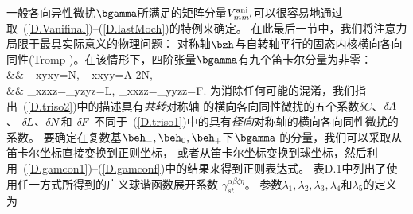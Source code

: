 一般各向异性微扰$\bgamma$所满足的矩阵分量$V_{mm'}^{\rm ani}$可以很容易地通过
取~(\ref{D.Vanifinal})--(\ref{D.lastMoch})的特例来确定。
在此最后一节中，我们将注意力局限于最具实际意义的物理问题：
对称轴$\bzh$与自转轴平行的固态内核横向各向同性(Tromp \citeyear{tromp95})。在该情形下，四阶张量$\bgamma$有九个笛卡尔分量为非零：
\eqa \label{D.triso2} 
\nonumber \\
&&\mbox{}\hspace{-7.0 mm}
\gamma_{xyxy}=\delta\hspace{-0.3 mm}N,\qquad
\gamma_{xxyy}=\delta\hspace{-0.3 mm}A-2\hspace{0.4 mm}\delta\hspace{-0.3 mm}N,
\\
&&\mbox{}\hspace{-7.0 mm}
\gamma_{xzxz}=\gamma_{yzyz}=\delta\hspace{-0.3 mm}L,\qquad
\gamma_{xxzz}=\gamma_{yyzz}=\delta\hspace{-0.3 mm}F. \nonumber
\ena
为消除任何可能的混淆，我们指出~(\ref{D.triso2})中的描述具有{\em 共转\/}对称轴
的横向各向同性微扰的五个系数$\delta C$、$\delta\hspace{-0.3 mm}A$、
$\delta\hspace{-0.3 mm}L$、$\delta\hspace{-0.3 mm}N$和
$\delta\hspace{-0.3 mm}F$ 
不同于~(\ref{D.triso1})中的具有{\em 径向\/}对称轴的横向各向同性微扰的系数。
要确定在复数基$\beh_-,\beh_0,\beh_+$下$\bgamma$ 的分量，我们可以采取从笛卡尔坐标直接变换到正则坐标，
或者从笛卡尔坐标变换到球坐标，然后利用~(\ref{D.gamcon1})--(\ref{D.gamconf})中的结果来得到正则表达式。
表D.1中列出了使用任一方式所得到的广义球谐函数展开系数 $\gamma_{st}^{\alpha\beta\zeta\eta}$。
参数$\lambda_1,\lambda_2,\lambda_3,\lambda_4$和$\lambda_5$的定义为
\eqa \label{D.5lambdas}  \nonumber \\
